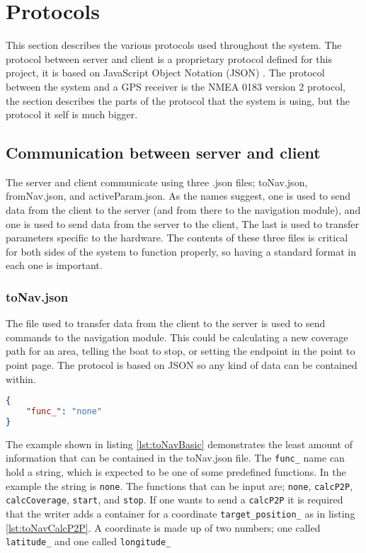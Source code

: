 \section{Protocols}
\label{sec:protocols}
This section describes the various protocols used throughout the system. The protocol between server and client is a proprietary protocol defined for this project, it is based on JavaScript Object Notation (JSON) \cite{jsobjectnotation}. The protocol between the system and a GPS receiver is the NMEA 0183 version 2 protocol, the section describes the parts of the protocol that the system is using, but the protocol it self is much bigger. 

\subsection{Communication between server and client}

The server and client communicate using three .json files; toNav.json, fromNav.json, and activeParam.json. As the names suggest, one is used to send data from the client to the server (and from there to the navigation module), and one is used to send data from the server to the client, The last is used to transfer parameters specific to the hardware. The contents of these three files is critical for both sides of the system to function properly, so having a standard format in each one is important. 

\subsubsection{toNav.json}

The file used to transfer data from the client to the server is used to send commands to the navigation module. This could be calculating a new coverage path for an area, telling the boat to stop, or setting the endpoint in the point to point page.
The protocol is based on JSON so any kind of data can be contained within.

\begin{lstlisting}[caption = {Example of the least information in the toNav.json file}, captionpos=b, label={lst:toNavBasic}, language=json,firstnumber=1]
{
	"func_": "none"
}
\end{lstlisting}

The example shown in listing \ref{lst:toNavBasic} demonstrates the least amount of information that can be contained in the toNav.json file. The \texttt{func_} name can hold a string, which is expected to be one of some predefined functions. In the example the string is \texttt{none}.
The functions that can be input are; \texttt{none}, \texttt{calcP2P}, \texttt{calcCoverage}, \texttt{start}, and \texttt{stop}.
If one wants to send a \texttt{calcP2P} it is required that the writer adds a container for a coordinate \texttt{target_position_} as in listing \ref{lst:toNavCalcP2P}. A coordinate is made up of two numbers; one called \texttt{latitude_} and one called \texttt{longitude_}

